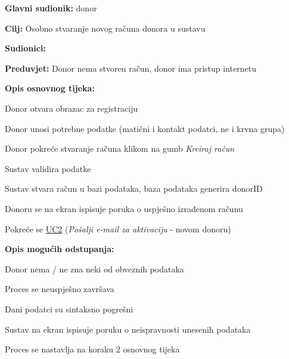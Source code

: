 					\noindent {}
					\begin{packed_item}
	
						\item \textbf{Glavni sudionik: }donor
						\item  \textbf{Cilj:} Osobno stvaranje novog računa donora u sustavu
						\item  \textbf{Sudionici:} 
						\item  \textbf{Preduvjet:} Donor nema stvoren račun, donor ima pristup internetu
						\item  \textbf{Opis osnovnog tijeka:}
						
						\item[] \begin{packed_enum}
                        	\item Donor otvara obrazac za registraciju
							\item Donor unosi potrebne podatke (matični i kontakt podatci, ne i krvna grupa)
							\item Donor pokreće stvaranje računa klikom na gumb \textit{Kreiraj račun}
							\item Sustav validira podatke 
							\item Sustav stvara račun u bazi podataka, baza podataka generira donorID
							\item Donoru se na ekran ispisuje poruka o uspješno izrađenom računu
							\item Pokreće se \hyperref[UC2]{UC2} (\textit{Pošalji e-mail za aktivaciju} - novom donoru)
						\end{packed_enum}
						
						\item  \textbf{Opis mogućih odstupanja:}
						
						\item[] \begin{packed_item}
	
                        	\item[2.a] Donor nema / ne zna neki od obveznih podataka
							\begin{packed_enum}
								\item Proces se neuspješno završava
							\end{packed_enum}
						
							\item[4.a] Dani podatci su sintaksno pogrešni
							\begin{packed_enum}
								\item Sustav na ekran ispisuje poruku o neispravnosti unesenih podataka
								\item Proces se nastavlja na koraku 2 osnovnog tijeka
							\end{packed_enum}
							

\end{packed_item}
\end{packed_item}
